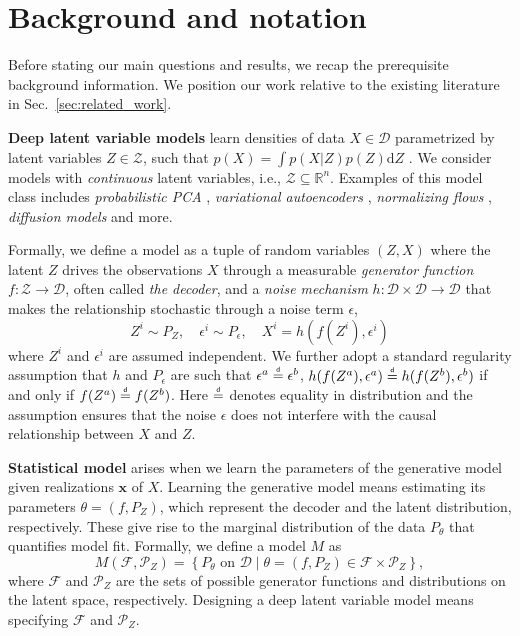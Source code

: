 \section{Background and notation}
\label{sec:background}
Before stating our main questions and results, we recap the prerequisite background information. We position our work relative to the existing literature in Sec.~\ref{sec:related_work}.

\textbf{Deep latent variable models} learn densities of data $X \in \mathcal{D}$ parametrized by latent variables $Z \in \mathcal{Z}$, such that $p(X) = \int p(X|Z) p(Z) \mathrm{d}Z$ \citep{tomczak2024deep}. We consider models with \emph{continuous} latent variables, i.e., $\mathcal{Z} \subseteq \mathbb{R}^n$. Examples of this model class includes \emph{probabilistic PCA} \citep{tipping1999probabilistic}, \emph{variational autoencoders} \citep{VAE, rezende2014stochastic}, \emph{normalizing flows} \citep{tabak2010density, lipman2022flow}, \emph{diffusion models} \citep{ho2020denoising} and more.

Formally, we define a model as a tuple of random variables $(Z, X)$ where the latent $Z$ drives the observations $X$ through a measurable \emph{generator function} $f:\mathcal{Z}\to \mathcal{D}$, often called \emph{the decoder}, and a \emph{noise mechanism} $h:\mathcal{D}\times \mathcal{D}\to \mathcal{D}$ that makes the relationship stochastic through a noise term $\epsilon$,
\begin{equation}
   Z^i \sim P_Z, \quad \epsilon^i \sim P_{\epsilon}, \quad X^i = h (f(Z^i), \epsilon^i) 
\end{equation}
where $Z^i$ and $\epsilon^i$ are assumed independent. We further adopt a standard regularity assumption that $h$ and $P_{\epsilon}$ are such that $\epsilon^a \eqdistrib \epsilon^b$, $h(f(Z^a), \epsilon^a) \eqdistrib h(f(Z^b), \epsilon^b)$ if and only if $f(Z^a) \eqdistrib f(Z^b)$. Here $\eqdistrib$ denotes equality in distribution and the assumption ensures that the noise $\epsilon$ does not interfere with the causal relationship between $X$ and $Z$. 

\textbf{Statistical model} arises when we learn the parameters of the generative model given realizations $\mathbf{x}$ of $X$. Learning the generative model means estimating its parameters $\theta = (f, P_Z)$, which represent the decoder and the latent distribution, respectively. These give rise to the marginal distribution of the data $P_{\theta}$ that quantifies model fit. Formally, we define a model $M$ as
\begin{equation} \label{eq:StatModLvm}
    M\left(\mathcal{F}, \mathcal{P}_Z\right)=\left\{P_\theta \text { on } \mathcal{D} \mid \theta=\left(f, P_Z\right) \in \mathcal{F} \times \mathcal{P}_Z\right\},
\end{equation}
where $\mathcal{F}$ and $\mathcal{P}_Z$ are the sets of possible generator functions and distributions on the latent space, respectively. Designing a deep latent variable model means specifying $\mathcal{F}$ and $\mathcal{P}_Z$.

